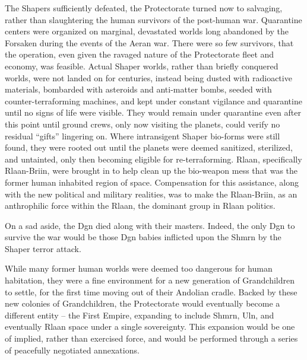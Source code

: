 The Shapers sufficiently defeated, the Protectorate turned now to salvaging, rather than slaughtering the human survivors of the post-human war. Quarantine centers were organized on marginal, devastated worlds long abandoned by the Forsaken during the events of the Aeran war. There were so few survivors, that the operation, even given the ravaged nature of the Protectorate fleet and economy, was feasible. Actual Shaper worlds, rather than briefly conquered worlds, were not landed on for centuries, instead being dusted with radioactive materials, bombarded with asteroids and anti-matter bombs, seeded with counter-terraforming machines, and kept under constant vigilance and quarantine until no signs of life were visible. They would remain under quarantine even after this point until ground crews, only now visiting the planets, could verify no residual “gifts” lingering on. Where intransigent Shaper bio-forms were still found, they were rooted out until the planets were deemed sanitized, sterilized, and untainted, only then becoming eligible for re-terraforming. Rlaan, specifically Rlaan-Briin, were brought in to help clean up the bio-weapon mess that was the former human inhabited region of space. Compensation for this assistance, along with the new political and military realities, was to make the Rlaan-Briin, as an anthrophilic force within the Rlaan, the dominant group in Rlaan politics.

On a sad aside, the Dgn died along with their masters. Indeed, the only Dgn to survive the war would be those Dgn babies inflicted upon the Shmrn by the Shaper terror attack.

While many former human worlds were deemed too dangerous for human habitation, they were a fine environment for a new generation of Grandchildren to settle, for the first time moving out of their Andolian cradle. Backed by these new colonies of Grandchildren, the Protectorate would eventually become a different entity – the First Empire, expanding to include Shmrn, Uln, and eventually Rlaan space under a single sovereignty. This expansion would be one of implied, rather than exercised force, and would be performed through a series of peacefully negotiated annexations. 

